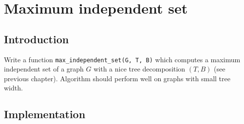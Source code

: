 \chapter{Maximum independent set}

\section{Introduction}

Write a function \verb`max_independent_set(G, T, B)` which computes a maximum independent set of a graph $G$ with a nice tree decomposition $(T, B)$ (see previous chapter). Algorithm should perform well on graphs with small tree width.

\section{Implementation}

